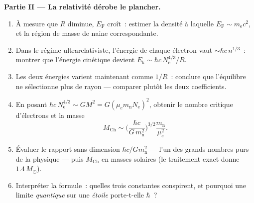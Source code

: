 \begin{problem}
\medskip\noindent\textbf{Partie II --- La relativité dérobe le
plancher.}
\begin{enumerate}[resume]
  \item À mesure que $R$ diminue, $E_{\text{F}}$ croît~: estimer la
        densité à laquelle $E_{\text{F}} \sim m_{\text{e}}c^2$, et
        la région de masse de naine correspondante.
  \item Dans le régime ultrarelativiste, l'énergie de chaque
        électron vaut $\sim\hbar c\,n^{1/3}$~: montrer que l'énergie
        cinétique devient
        $E_{\text{k}} \sim \hbar c\,N_{\text{e}}^{4/3}/R$.
  \item Les deux énergies varient maintenant comme $1/R$~: conclure
        que l'équilibre ne sélectionne plus de rayon --- comparer
        plutôt les deux coefficients.
  \item En posant $\hbar c\,N_{\text{e}}^{4/3} \sim
        GM^2 = G(\mu_em_{\text{n}}N_{\text{e}})^2$, obtenir le
        nombre critique d'électrons et la masse
        \[
        M_{\text{Ch}} \sim
        \Big(\frac{\hbar c}{G\,m_{\text{n}}^2}\Big)^{3/2}
        \frac{m_{\text{n}}}{\mu_e^2} .
        \]
  \item Évaluer le rapport sans dimension $\hbar c/Gm_{\text{n}}^2$
        --- l'un des grands nombres purs de la physique --- puis
        $M_{\text{Ch}}$ en masses solaires (le traitement exact
        donne $1.4\,M_\odot$).
  \item Interpréter la formule~: quelles trois constantes
        conspirent, et pourquoi une limite \emph{quantique} sur une
        \emph{étoile} porte-t-elle $\hbar$~?
\end{enumerate}


\end{problem}
